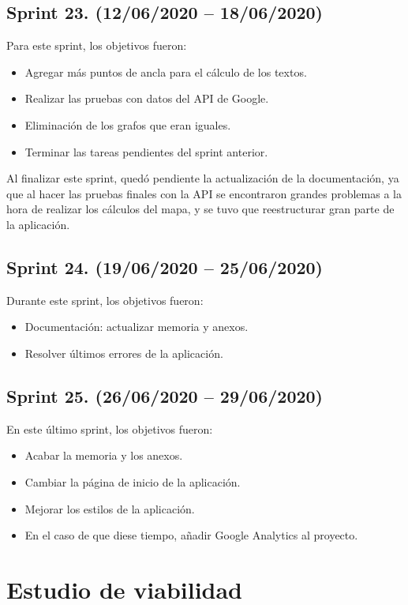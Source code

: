 \subsection{Sprint 23. (12/06/2020 -- 18/06/2020)}
Para este sprint, los objetivos fueron:
\begin{itemize}
	\item Agregar más puntos de ancla para el cálculo de los textos.
	\item Realizar las pruebas con datos del API de Google.
	\item Eliminación de los grafos que eran iguales.
	\item Terminar las tareas pendientes del sprint anterior.
\end{itemize}

Al finalizar este sprint, quedó pendiente la actualización de la documentación, ya que al hacer las pruebas finales con la API se encontraron grandes problemas a la hora de realizar los cálculos del mapa, y se tuvo que reestructurar gran parte de la aplicación.

\subsection{Sprint 24. (19/06/2020 -- 25/06/2020)}
Durante este sprint, los objetivos fueron:
\begin{itemize}
	\item Documentación: actualizar memoria y anexos.
	\item Resolver últimos errores de la aplicación.
\end{itemize}


\subsection{Sprint 25. (26/06/2020 -- 29/06/2020)}
En este último sprint, los objetivos fueron:
\begin{itemize}
	\item Acabar la memoria y los anexos.
	\item Cambiar la página de inicio de la aplicación.
	\item Mejorar los estilos de la aplicación.
	\item En el caso de que diese tiempo, añadir Google Analytics al proyecto.
\end{itemize}


\section{Estudio de viabilidad}

